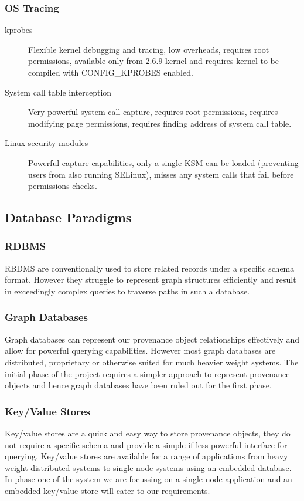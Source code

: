 \subsubsection{OS Tracing}
\begin{description}
\item[kprobes] Flexible kernel debugging and tracing, low overheads, requires root permissions, available only from 2.6.9 kernel and requires kernel to be compiled with CONFIG\_KPROBES enabled.
\item[System call table interception] Very powerful system call capture, requires root permissions, requires modifying page permissions, requires finding address of system call table.
\item[Linux security modules] Powerful capture capabilities, only a single KSM can be loaded (preventing users from also running SELinux), misses any system calls that fail before permissions checks.
\end{description}

\subsection{Database Paradigms}

\subsubsection{RDBMS}
RBDMS are conventionally used to store related records under a specific schema format. However they struggle to represent graph structures efficiently and result in exceedingly complex queries to traverse paths in such a database. 

\subsubsection{Graph Databases}
Graph databases can represent our provenance object relationships effectively and allow for powerful querying capabilities. However most graph databases are distributed, proprietary or otherwise suited for much heavier weight systems. The initial phase of the project requires a simpler approach to represent provenance objects and hence graph databases have been ruled out for the first phase.

\subsubsection{Key/Value Stores}
Key/value stores are a quick and easy way to store provenance objects, they do not require a specific schema and provide a simple if less powerful interface for querying. Key/value stores are available for a range of applications from heavy weight distributed systems to single node systems using an embedded database. In phase one of the system we are focussing on a single node application and an embedded key/value store will cater to our requirements.
